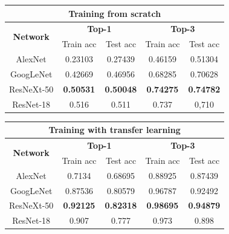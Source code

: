 \documentclass{article}
\begin{document}
\begin{table}[]
	\begin{tabular}{|c|c|c|c|c|}
		\hline
		\multicolumn{5}{|c|}{\textbf{Training from scratch}}                                                          \\ \hline
		\multirow{2}{*}{\textbf{Network}} & \multicolumn{2}{c|}{\textbf{Top-1}} & \multicolumn{2}{c|}{\textbf{Top-3}} \\ \cline{2-5} 
		& Train acc        & Test acc         & Train acc        & Test acc         \\ \hline
		AlexNet                           & 0.23103          & 0.27439          & 0.46159          & 0.51304          \\ \hline
		GoogLeNet                         & 0.42669          & 0.46956          & 0.68285          & 0.70628          \\ \hline
		ResNeXt-50                        & \textbf{0.50531} & \textbf{0.50048} & \textbf{0.74275} & \textbf{0.74782} \\ \hline
		ResNet-18 \cite{ArtistIdCNN406}                    & 0.516            & 0.511            & 0.737            & 0,710            \\ \hline
	\end{tabular}
	\begin{tabular}{|c|c|c|c|c|}
		\hline
		\multicolumn{5}{|c|}{\textbf{Training with transfer learning}}                                                           \\ \hline
		\multirow{2}{*}{\textbf{Network}} & \multicolumn{2}{c|}{\textbf{Top-1}}  & \multicolumn{2}{c|}{\textbf{Top-3}} \\ \cline{2-5} 
		& Train acc        & Test acc          & Train acc         & Test acc        \\ \hline
		AlexNet                           & 0.7134           & 0.68695           & 0.88925           & 0.87439         \\ \hline
		GoogLeNet                         & 0.87536          & 0.80579           & 0.96787           & 0.92492         \\ \hline
		ResNeXt-50                        & \textbf{0.92125} & \textbf{0.82318} & \textbf{0.98695}  & \textbf{0.94879} \\ \hline
		ResNet-18 \cite{ArtistIdCNN406}                    & 0.907            & 0.777             & 0.973             & 0.898           \\ \hline
	\end{tabular}
	\label{table}
\end{table}
\end{document}
